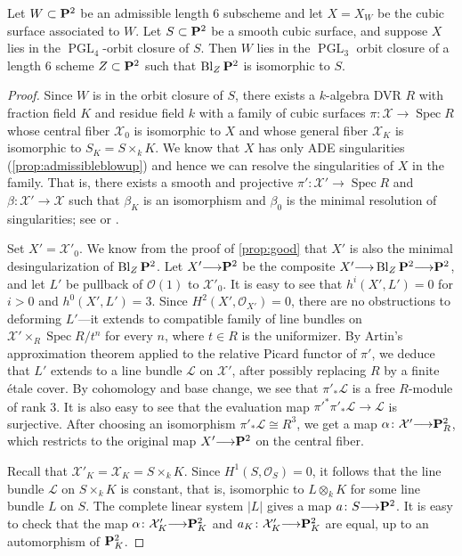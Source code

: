 \documentclass[reqno]{amsart}
\renewcommand{\k}{k}
\DeclareMathOperator{\Bl}{Bl}
\renewcommand{\to}{{\longrightarrow}}
\renewcommand {\P}{{\bf P}}
\providecommand{\PGL}{\operatorname{PGL}}
\providecommand{\spec}{\operatorname{Spec}}
\numberwithin{equation}{section}
\renewcommand{\O}{\mathcal{O}}
\begin{document}
\begin{proposition}\label{prop:cubictopoints}
  Let $W \subset \P^2$ be an admissible length 6 subscheme and let $X = X_W$ be the cubic surface associated to $W$.
  Let $S \subset \P^2$ be a smooth cubic surface, and suppose $X$ lies in the $\PGL_4$-orbit closure of $S$.
  Then $W$ lies in the $\PGL_3$ orbit closure of a length 6 scheme $Z \subset \P^2$ such that $\Bl_Z \P^2$ is isomorphic to $S$.
\end{proposition}
\begin{proof}
  Since $W$ is in the orbit closure of $S$, there exists a $\k$-algebra DVR $R$ with fraction field $K$ and residue field $k$ with a family of cubic surfaces $\pi \colon \mathcal{X} \to \spec R$ whose central fiber $\mathcal{X}_0$ is isomorphic to $X$ and whose general fiber $\mathcal{X}_K$ is isomorphic to $S_K = S \times_k K$.
  We know that $X$ has only ADE singularities (\autoref{prop:admissibleblowup}) and hence we can resolve the singularities of $X$ in the family.
  That is, there exists a smooth and projective $\pi' \colon \mathcal{X}' \to \spec R$ and $\beta \colon \mathcal{X}' \to \mathcal{X}$ such that $\beta_K$ is an isomorphism and $\beta_0$ is the minimal resolution of singularities; see \cite{bri:70} or \cite{tju:70}.

  Set $X' = \mathcal{X}'_0$.
  We know from the proof of \autoref{prop:good} that $X'$ is also the minimal desingularization of $\Bl_Z\P^2$.
  Let $X' \to \P^2$ be the composite $X' \to \Bl_Z \P^2 \to \P^2$, and let $L'$ be pullback of $\O(1)$ to $\mathcal{X}'_0$.
  It is easy to see that $h^i(X', L') = 0$ for $i > 0$ and $h^0(X', L') = 3$.
  Since $H^2(X', \O_{X'}) = 0$, there are no obstructions to deforming $L'$---it extends to compatible family of line bundles on $\mathcal{X}' \times_R \spec R/t^n$ for every $n$, where $t \in R$ is the uniformizer.
  By Artin's approximation theorem \cite{art:69} applied to the relative Picard functor of $\pi'$, we deduce that $L'$ extends to a line bundle $\mathcal{L}$ on $\mathcal{X}'$, after possibly replacing $R$ by a finite \'etale cover.
  By cohomology and base change, we see that $\pi'_* \mathcal{L}$ is a free $R$-module of rank 3.
  It is also easy to see that the evaluation map $\pi'^*\pi'_* \mathcal{L} \to \mathcal{L}$ is surjective.
  After choosing an isomorphism $\pi'_* \mathcal{L} \cong R^3$, we get a map $\alpha \colon \mathcal{X}' \to \P^2_R$, which restricts to the original map $X' \to \P^2$ on the central fiber.

  Recall that $\mathcal{X}'_K = \mathcal{X}_K = S \times_k K$.
  Since $H^1(S, \O_S) = 0$, it follows that the line bundle $\mathcal{L}$ on $S \times_k K$ is constant, that is, isomorphic to $L \otimes_k K$ for some line bundle $L$ on $S$.
  The complete linear system $|L|$ gives a map $a \colon S \to \P^2$.
  It is easy to check that the map $\alpha \colon \mathcal{X}'_K \to \P^2_K$ and $a_K \colon \mathcal{X}'_K \to \P^2_K$ are equal, up to an automorphism of $\P^2_K$.


\end{proof}
\end{document}
